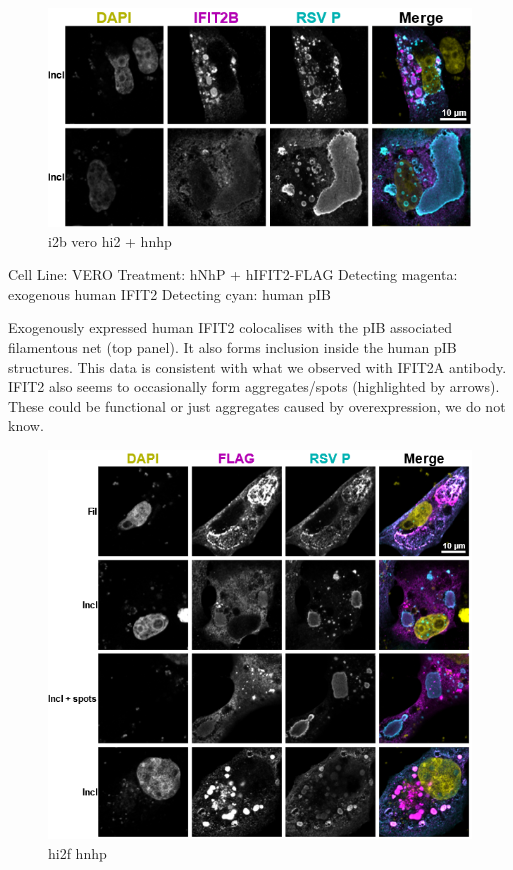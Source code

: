 \begin{figure}
    \centering
    \includegraphics[width=1\linewidth]{10. Chapter 5/Figs/03. IFIT2-FLAG/03. i2b vero hnhp (2).png}
    \caption[i2b vero hi2 + hnhp]{i2b vero hi2 + hnhp}
    \label{fig:i2b vero hi2 + hnhp}
\end{figure}


Cell Line: VERO \newline
Treatment: hNhP + hIFIT2-FLAG \newline
Detecting magenta: exogenous human IFIT2 \newline
Detecting cyan: human pIB \newline

Exogenously expressed human IFIT2 colocalises with the pIB associated filamentous net (top panel). It also forms inclusion inside the human pIB structures. This data is consistent with what we observed with IFIT2A antibody. IFIT2 also seems to occasionally form aggregates/spots (highlighted by arrows). These could be functional or just aggregates caused by overexpression, we do not know.

\begin{figure}
    \centering
    \includegraphics[width=1\linewidth]{10. Chapter 5/Figs/03. IFIT2-FLAG/04. hi2f hnhp.png}
    \caption[hi2f hnhp]{hi2f hnhp}
    \label{hi2f hnhp}
\end{figure}

